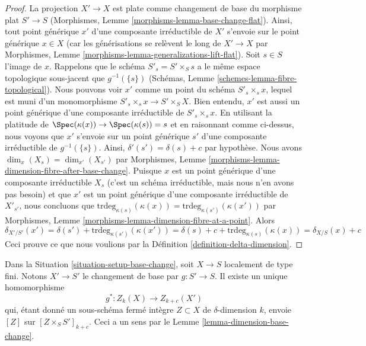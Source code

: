 \begin{proof}
La projection $X' \to X$ est plate comme changement de base du morphisme plat
$S' \to S$ (Morphismes, Lemme \ref{morphisms-lemma-base-change-flat}).
Ainsi, tout point générique $x'$ d'une composante irréductible
de $X'$ s'envoie sur le point générique $x \in X$ (car les générisations
se relèvent le long de $X' \to X$ par
Morphismes, Lemme \ref{morphisms-lemma-generalizations-lift-flat}).
Soit $s \in S$ l'image de $x$.
Rappelons que le schéma $S'_s = S' \times_S s$
a le même espace topologique sous-jacent que $g^{-1}(\{s\})$
(Schémas, Lemme \ref{schemes-lemma-fibre-topological}).
Nous pouvons voir $x'$ comme un point du schéma $S'_s \times_s x$, lequel
est muni d'un monomorphisme $S'_s \times_s x \to S' \times_S X$.
Bien entendu, $x'$ est aussi un point générique d'une composante irréductible
de $S'_s \times_s x$.
En utilisant la platitude de $\Spec(\kappa(x)) \to \Spec(\kappa(s)) = s$
et en raisonnant comme ci-dessus, nous voyons que $x'$ s'envoie sur un point générique $s'$
d'une composante irréductible de $g^{-1}(\{s\})$. Ainsi,
$\delta'(s') = \delta(s) + c$ par hypothèse.
Nous avons $\dim_x(X_s) = \dim_{x'}(X_{s'})$ par
Morphismes, Lemme \ref{morphisms-lemma-dimension-fibre-after-base-change}.
Puisque $x$ est un point générique d'une composante irréductible $X_s$
(c'est un schéma irréductible, mais nous n'en avons pas besoin) et que
$x'$ est un point générique d'une composante irréductible de $X'_{s'}$, nous concluons
que $\text{trdeg}_{\kappa(s)}(\kappa(x)) = 
\text{trdeg}_{\kappa(s')}(\kappa(x'))$
par Morphismes, Lemme \ref{morphisms-lemma-dimension-fibre-at-a-point}.
Alors
$$
\delta_{X'/S'}(x') = \delta(s') + \text{trdeg}_{\kappa(s')}(\kappa(x')) =
\delta(s) + c + \text{trdeg}_{\kappa(s)}(\kappa(x)) = \delta_{X/S}(x) + c
$$
Ceci prouve ce que nous voulions par la Définition \ref{definition-delta-dimension}.
\end{proof}

\noindent
Dans la Situation \ref{situation-setup-base-change}, soit $X \to S$ localement
de type fini. Notons $X' \to S'$ le changement de base par $g : S' \to S$.
Il existe un unique homomorphisme
$$
g^* : Z_k(X) \longrightarrow Z_{k + c}(X')
$$
qui, étant donné un sous-schéma fermé intègre $Z \subset X$ de
$\delta$-dimension $k$, envoie $[Z]$ sur $[Z \times_S S']_{k + c}$.
Ceci a un sens par le Lemme \ref{lemma-dimension-base-change}.


